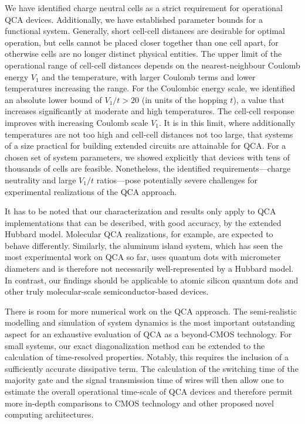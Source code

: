 We have identified charge neutral cells as a strict requirement for operational
QCA devices. Additionally, we have established parameter bounds for a functional
system. Generally, short cell-cell distances are desirable for optimal
operation, but cells cannot be placed closer together than one cell apart, for
otherwise cells are no longer distinct physical entities. The upper limit of the 
operational range of cell-cell distances depends on the nearest-neighbour
Coulomb energy $V_1$ and the temperature, with larger Coulomb terms and lower
temperatures increasing the range. For the Coulombic energy scale, we identified
an absolute lower bound of $V_1/t > 20$ (in units of the hopping $t$), a value
that increases significantly at moderate and high temperatures. The cell-cell
response improves with increasing Coulomb scale $V_1$. It is in this limit,
where additionally temperatures are not too high and cell-cell distances not too
large, that systems of a size practical for building extended circuits are
attainable for QCA. For a chosen set of system parameters, we showed explicitly
that devices with tens of thousands of cells are feasible. Nonetheless, the
identified requirements---charge neutrality and large $V_1/t$ ratios---pose
potentially severe challenges for experimental realizations of the QCA approach.

It has to be noted that our characterization and results only apply to QCA
implementations that can be described, with good accuracy, by the extended
Hubbard model. Molecular QCA realizations, for example, are expected to behave
differently. Similarly, the aluminum island system, which has seen the most
experimental work on QCA so far, uses quantum dots with micrometer diameters and
is therefore not necessarily well-represented by a Hubbard model. In contrast,
our findings should be applicable to atomic silicon quantum dots and other truly
molecular-scale semiconductor-based devices.

There is room for more numerical work on the QCA approach. The semi-realistic
modelling and simulation of system dynamics is the most important outstanding
aspect for an exhaustive evaluation of QCA as a beyond-CMOS technology. For
small systems, our exact diagonalization method can be extended to the
calculation of time-resolved properties. Notably, this requires the inclusion of
a sufficiently accurate dissipative term. The calculation of the switching time
of the majority gate and the signal transmission time of wires will then allow
one to estimate the overall operational time-scale of QCA devices and therefore
permit more in-depth comparisons to CMOS technology and other proposed novel
computing architectures.

